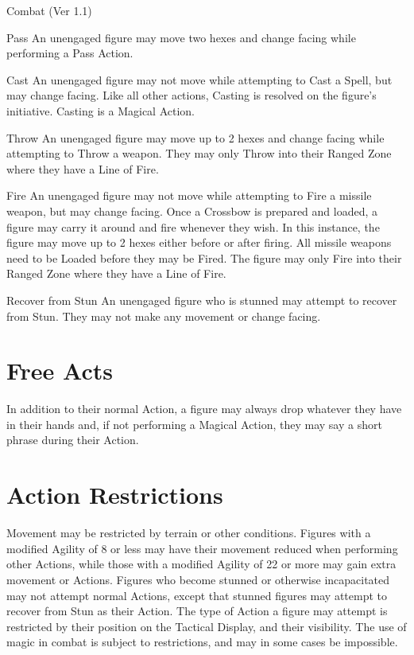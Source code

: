 \begin{Chapter}{Combat (Ver 1.1)}
\begin{Description}
\item[Pass]An unengaged figure may move two hexes and change facing
  while performing a Pass Action.

\item[Cast] An unengaged figure may not move while attempting to Cast
  a Spell, but may change facing. Like all other actions, Casting is
  resolved on the figure’s initiative. Casting is a Magical Action.

\item[Throw] An unengaged figure may move up to 2 hexes and change
  facing while attempting to Throw a weapon.  They may only Throw into
  their Ranged Zone where they have a Line of Fire.

\item[Fire] An unengaged figure may not move while attempting to Fire
  a missile weapon, but may change facing.  Once a Crossbow is
  prepared and loaded, a figure may carry it around and fire whenever
  they wish. In this instance, the figure may move up to 2 hexes
  either before or after firing.  All missile weapons need to be
  Loaded before they may be Fired.  The figure may only Fire into
  their Ranged Zone where they have a Line of Fire.

\item[Recover from Stun] An unengaged figure who is stunned may
  attempt to recover from Stun.  They may not make any movement or
  change facing.

\end{Description}

\section{Free Acts}
\label{combat:freeacts}

In addition to their normal Action, a figure may always drop whatever
they have in their hands and, if not performing a Magical Action, they
may say a short phrase during their Action.

\section{Action Restrictions}
\label{combat:restrictions}

Movement may be restricted by terrain or other conditions. Figures
with a modified Agility of 8 or less may have their movement reduced
when performing other Actions, while those with a modified Agility of
22 or more may gain extra movement or Actions. Figures who become
stunned or otherwise incapacitated may not attempt normal Actions,
except that stunned figures may attempt to recover from Stun as their
Action.  The type of Action a figure may attempt is restricted by
their position on the Tactical Display, and their visibility. The use
of magic in combat is subject to restrictions, and may in some cases
be impossible.


\end{Chapter}
